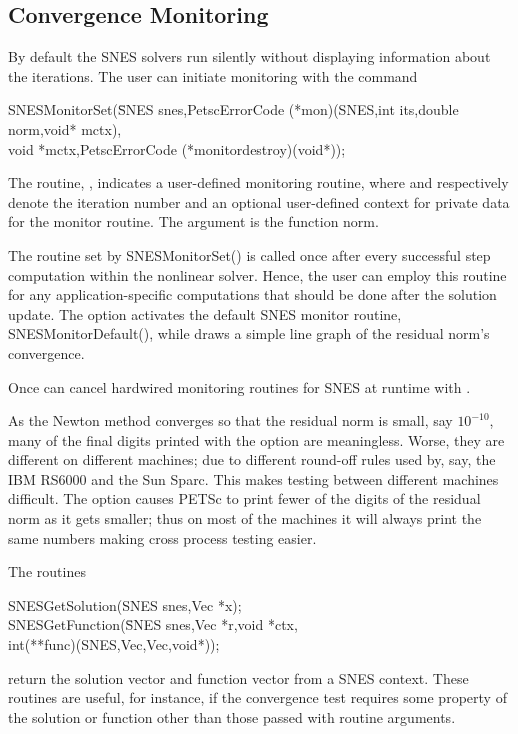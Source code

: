 \subsection{Convergence Monitoring}
\label{sec_snesmonitor}

By default the SNES solvers run silently without displaying information
about the iterations. The user can initiate monitoring with the
command  
\begin{tabbing}
  SNESMonitorSet(\=SNES snes,PetscErrorCode (*mon)(SNES,int its,double norm,void* mctx),\\
                 \>        void *mctx,PetscErrorCode (*monitordestroy)(void*));
\end{tabbing}
The routine, , indicates a user-defined monitoring routine,
where  and  respectively denote the iteration
number and an optional user-defined context for private data for the
monitor routine.  The argument  is the function norm.

The routine set by SNESMonitorSet() is called once after every
successful step computation within the nonlinear solver.  Hence, the
user can employ this routine for any application-specific computations
that should be done after the solution update. The option
  activates the default
SNES monitor routine, SNESMonitorDefault(), 
while   draws
a simple line graph of the residual norm's convergence.

Once can cancel hardwired monitoring routines for SNES at runtime with 
. 

As the Newton method converges so that the residual norm is small,
say $ 10^{-10} $, many of the final digits printed with the 
option are meaningless. Worse, they are different on different 
machines; due to different round-off rules used by, say, the IBM RS6000
and the Sun Sparc. This makes testing between different machines
difficult. The option  
causes PETSc to print fewer of the digits of the residual norm 
as it gets smaller; thus on most of the machines it will always
print the same numbers making cross process testing easier.

The routines  
\begin{tabbing}
  SNESGetSolution(SNES snes,Vec *x);\\
  SNESGetFunction(\=SNES snes,Vec *r,void *ctx,\\
                  \>        int(**func)(SNES,Vec,Vec,void*));
\end{tabbing}
return the solution vector and function vector from a SNES context. 
These routines are useful, for instance, if the convergence test requires 
some property of the solution or function other than those passed with
routine arguments.

